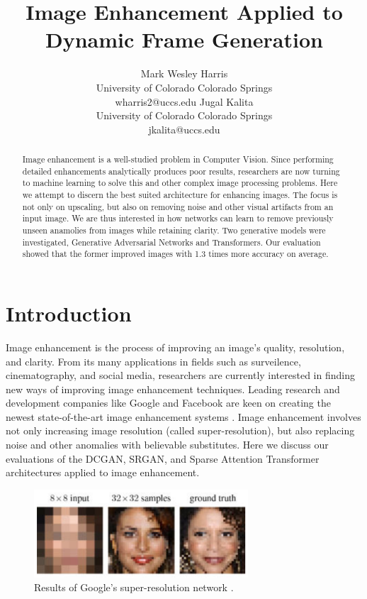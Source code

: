 \documentclass[letterpaper]{article} %
\title{Image Enhancement Applied to Dynamic Frame Generation}
\author{Mark Wesley Harris\\ %
University of Colorado Colorado Springs\\
wharris2@uccs.edu %
\And
Jugal Kalita\\
University of Colorado Colorado Springs\\
jkalita@uccs.edu
}
\begin{document}
\maketitle

\begin{abstract}
Image enhancement is
a well-studied problem in Computer Vision.
Since performing detailed enhancements analytically produces poor results,
researchers are now turning to machine learning to solve
this and other complex image processing problems.
Here we attempt to discern the best suited architecture for enhancing images.
The focus is not only on upscaling, but also on removing noise and other visual artifacts from an input image.
We are thus interested in how networks can learn to remove previously unseen anamolies from images
while retaining clarity.
Two generative models were investigated,
Generative Adversarial Networks and Transformers.
Our evaluation showed that the former improved images with 1.3 times more accuracy on average.
\end{abstract}

\section{Introduction}
Image enhancement is the process of improving an image's quality,
resolution, and clarity.
From its many applications in fields such as surveilence, cinematography, and social media,
researchers are currently interested
in finding new ways of improving image enhancement techniques.
Leading research and development companies like Google and Facebook are keen on creating the newest
state-of-the-art image enhancement systems \cite{google}.
Image enhancement involves not only increasing image resolution
(called super-resolution), but also replacing noise and other anomalies with
believable substitutes.
Here we discuss our evaluations of
the DCGAN, SRGAN, and Sparse Attention Transformer architectures
applied to image enhancement.

\begin{figure}[htbp]
\centerline{\includegraphics[width=8cm]{google.png}}
\caption{Results of Google's super-resolution network \cite{google}.}
\label{fig:google}
\end{figure}
\end{document}
